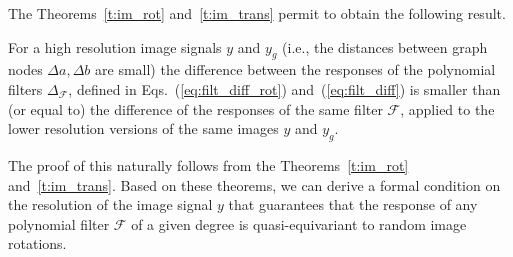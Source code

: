 \documentclass[10pt,journal,compsoc]{IEEEtran}
\begin{document}
		The Theorems~\ref{t:im_rot} and~\ref{t:im_trans} permit to obtain the following result.
	\begin{lemma}
		For a high resolution image signals $y$ and $y_g$ (i.e., the distances between graph nodes $\Delta a, \Delta b$ are small) the difference between the responses of the polynomial filters $\Delta_\mathcal{F}$, defined in Eqs.~(\ref{eq:filt_diff_rot}) and~(\ref{eq:filt_diff}) is smaller than (or equal to) the difference of the responses of the same filter $\mathcal{F}$, applied to the lower resolution versions of the same images $y$ and $y_g$. %
	\end{lemma}
	The proof of this naturally follows from the Theorems~\ref{t:im_rot} and~\ref{t:im_trans}. Based on these theorems, we can derive a formal condition on the resolution of the image signal $y$ that guarantees that the response of any polynomial filter $\mathcal{F}$ of a given degree is quasi-equivariant to random image rotations. 
	
\end{document}
